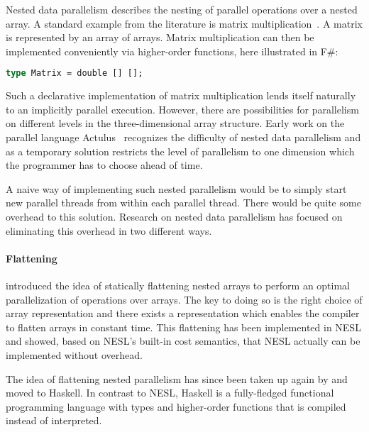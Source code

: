 \documentclass[a4paper]{article}
\begin{document}
Nested data parallelism describes the nesting of parallel operations
over a nested array. A standard example from the literature is matrix
multiplication~\cite{Keller:2010:RSP:1863543.1863582}. A matrix is
represented by an array of arrays. Matrix multiplication can then be
implemented conveniently via higher-order functions, here illustrated
in F\#:

\begin{lstlisting}[language=ML]
type Matrix = double [] [];
\end{lstlisting}

Such a declarative implementation of matrix multiplication lends
itself naturally to an implicitly parallel execution. However, there
are possibilities for parallelism on different levels in the
three-dimensional array structure. Early work on the parallel language
Actulus~\cite{Perrott:1979:LAV:357073.357075} recognizes the
difficulty of nested data parallelism and as a temporary solution
restricts the level of parallelism to one dimension which the
programmer has to choose ahead of time.

A naive way of implementing such nested parallelism would be to simply
start new parallel threads from within each parallel thread. There
would be quite some overhead to this solution. Research on nested data
parallelism has focused on eliminating this overhead in two different
ways.

\paragraph{Flattening}

\citet{Blelloch1993Implementation} introduced the idea of statically
flattening nested arrays to perform an optimal parallelization of
operations over arrays. The key to doing so is the right choice of
array representation and there exists a representation which enables
the compiler to flatten arrays in constant time. This flattening has
been implemented in NESL and \citet{Blelloch:1996:PTS:232627.232650}
showed, based on NESL's built-in cost semantics, that NESL actually
can be implemented without overhead.

The idea of flattening nested parallelism has since been taken up
again by \citet{Lippmeier:2012:WEH:2364527.2364564} and moved to
Haskell. In contrast to NESL, Haskell is a fully-fledged functional
programming language with types and higher-order functions that is
compiled instead of interpreted.
\end{document}
